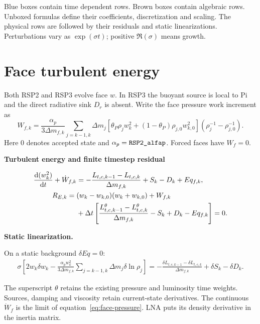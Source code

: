\documentclass[11pt]{article}
\newcommand{\code}[1]{\texttt{\detokenize{#1}}}
\newenvironment{solved}[2]{%
 \begin{tcolorbox}[colback=#1!3!white,colframe=#1,boxrule=0.4pt,
 leftrule=2pt,arc=0pt,left=7pt,right=7pt,top=5pt,bottom=5pt,
 before skip=7pt,after skip=7pt]
 \noindent\textcolor{#1}{\textbf{#2}}\par
 \setlength{\abovedisplayskip}{5pt}\setlength{\belowdisplayskip}{5pt}
}{\end{tcolorbox}}
\newcommand{\linear}{\par\smallskip\noindent\textcolor{Dynamic}{\textbf{Static linearization.}}\par}
\numberwithin{equation}{section}
\begin{document}
\textcolor{Dynamic}{Blue boxes} contain time dependent rows.
\textcolor{Algebraic}{Brown boxes} contain algebraic rows.
Unboxed formulas define their coefficients, discretization and scaling.
The physical rows are followed by their residuals and static linearizations.
Perturbations vary as $\exp(\sigma t)$; positive $\Re(\sigma)$ means growth.

\clearpage
\section{Face turbulent energy}
Both RSP2 and RSP3 evolve face $w$. In RSP3 the buoyant source is local to
Pi and the direct radiative sink $D_r$ is absent. Write the face pressure
work increment as
\begin{equation}
 W_{f,k}=\frac{\alpha_p}{3\Delta m_{f,k}}
 \sum_{j=k-1,k}\Delta m_j
 [\theta_P\rho_jw_k^2+(1-\theta_P)\rho_{j,0}w_{k,0}^2]
 (\rho_j^{-1}-\rho_{j,0}^{-1}).
 \label{eq:face-pressure}
\end{equation}
Here $0$ denotes accepted state and $\alpha_p=\code{RSP2_alfap}$.
Forced faces have $W_f=0$.
\begin{solved}{Dynamic}{Turbulent energy and finite timestep residual}
\begin{align}
 \frac{\mathrm d(w_k^2)}{\mathrm d t}+\dot W_{f,k}
  &=-\frac{L_{t,c,k-1}-L_{t,c,k}}{\Delta m_{f,k}}+S_k-D_k+Eq_{f,k},
 \label{eq:et}\\
 R_{E,k}={}&(w_k-w_{k,0})(w_k+w_{k,0})+W_{f,k}\notag\\
 &+\Delta t\left[\frac{L_{t,c,k-1}^{\theta}-L_{t,c,k}^{\theta}}
 {\Delta m_{f,k}}-S_k+D_k-Eq_{f,k}\right]=0.
 \label{eq:energy-residual}
\end{align}
\linear
On a static background $\delta Eq=0$:
\begin{equation}
 \begin{aligned}
 \sigma\left[2w_k\delta w_k-
 \frac{\alpha_pw_k^2}{3\Delta m_{f,k}}
 \sum_{j=k-1,k}\Delta m_j\delta\ln\rho_j\right]
 =-\frac{\delta L_{t,c,k-1}-\delta L_{t,c,k}}{\Delta m_{f,k}}
 +\delta S_k-\delta D_k.
 \end{aligned}
\end{equation}
\end{solved}
The superscript $\theta$ retains the existing pressure and luminosity time
weights. Sources, damping and viscosity retain current-state derivatives.
The continuous $\dot W_f$ is the limit of equation~\eqref{eq:face-pressure}.
LNA puts its density derivative in the inertia matrix.
\end{document}
